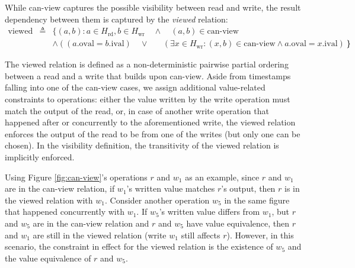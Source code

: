   While can-view captures the possible visibility between read and write, the
  result dependency between them is captured by the \textit{viewed} relation:
  \begin{eqnarray*}
    \text{viewed} & \triangleq & \{(a, b) : a \in H_\text{rd}, b \in
      H_\text{wr} \quad \land \quad (a, b) \in \text{can-view} \\
      & & \land (
        (a.\text{oval} = b.\text{ival}) \quad \lor \quad
        \text{ }(\exists x \in H_\text{wr} : (x, b) \in
        \text{can-view} \land a.\text{oval} = x.\text{ival})
      )
    \}
  \end{eqnarray*}


  The viewed relation is defined as a non-deterministic
  pairwise partial ordering
  between a read and a write that builds upon can-view. Aside from timestamps
  falling into one of the can-view cases, we
  assign additional value-related constraints to operations: either the value
  written by the write operation must match the output
  of the read, or, in case of another write operation that happened after or
  concurrently to the aforementioned write, the viewed relation enforces the
  output of the read to be from one of the writes (but only one can be chosen).
  In the visibility definition, the transitivity of the viewed relation
  is implicitly
  enforced.

  Using Figure \ref{fig:can-view}'s operations $r$ and $w_1$ as an example,
  since $r$ and $w_1$ are in the can-view relation, if $w_1$'s written
  value matches $r$'s output, then $r$ is in the viewed relation with $w_1$.
  Consider another operation $w_5$ in the same figure that happened
  concurrently with $w_1$. If $w_5$'s written value differs
  from $w_1$, but $r$ and $w_5$ are in the can-view relation and $r$ and
  $w_5$ have value equivalence, then $r$ and $w_1$ are still in the viewed
  relation (write $w_1$ still affects $r$).
  However, in this scenario, the constraint in effect for the viewed
  relation is the existence of $w_5$ and the value equivalence of $r$ and $w_5$.

